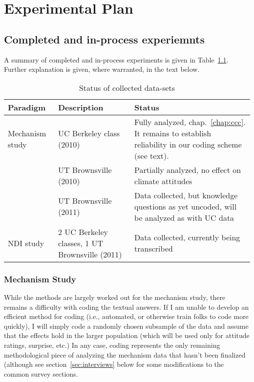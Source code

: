 \graphicspath{{experimental-description/}}

\chapter{Experimental Plan}

\section{Completed and in-process experiemnts}

A summary of completed and in-process experiments is given in
Table~\ref{table:collected}. Further explanation is given, where warranted, in
the text below.

\begin{table}
\begin{tabular}{lp{}p{}}
Paradigm & Description & Status \\ 
\hline \hline
Mechanism study 
    & UC Berkeley class (2010) & Fully analyzed, chap.~\ref{chap:ccc}. It
    remains to establish reliability in our coding scheme (see text). \\
    & UT Brownsville (2010) & Partially analyzed, no effect on climate attitudes \\
    & UT Brownsville (2011) & Data collected, but knowledge questions as yet
        uncoded, will be analyzed as with UC data \\

NDI study 
    & 2 UC Berkeley classes, 1 UT Brownsville (2011) & Data collected, currently
        being transcribed \\
\hline
\end{tabular}
\caption{Status of collected data-sets}
\label{table:collected}
\end{table}


\subsection{Mechanism Study}

While the methods are largely worked out for the mechanism study, there remains
a difficulty with coding the textual answers. If I am unable to develop an
efficient method for coding (i.e., automated, or otherwise train folks to code
more quickly), I will simply code a randomly chosen subsample of the data and
assume that the effects hold in the larger population (which will be used only
for attitude ratings, surprise, etc.) In any case, coding represents the only
remaining methodological piece of analyzing the mechanism data that hasn't been
finalized (although see section~\ref{sec:interviews} below for some
modifications to the common survey sections.


